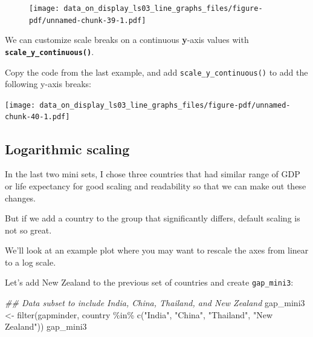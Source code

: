 \documentclass[
  letterpaper,
  DIV=11,
  numbers=noendperiod]{scrreprt}
\newenvironment{Shaded}{\begin{snugshade}}{\end{snugshade}}
\newcommand{\DocumentationTok}[1]{\textcolor[rgb]{0.37,0.37,0.37}{\textit{#1}}}
\newcommand{\FunctionTok}[1]{\textcolor[rgb]{0.28,0.35,0.67}{#1}}
\newcommand{\NormalTok}[1]{\textcolor[rgb]{0.00,0.23,0.31}{#1}}
\newcommand{\OtherTok}[1]{\textcolor[rgb]{0.00,0.23,0.31}{#1}}
\newcommand{\SpecialCharTok}[1]{\textcolor[rgb]{0.37,0.37,0.37}{#1}}
\newcommand{\StringTok}[1]{\textcolor[rgb]{0.13,0.47,0.30}{#1}}
\begin{document}
\begin{figure}[H]

{\centering \texttt{[image: data\_on\_display\_ls03\_line\_graphs\_files/figure-pdf/unnamed-chunk-39-1.pdf]}

}

\end{figure}

\begin{tcolorbox}[enhanced jigsaw, colframe=quarto-callout-tip-color-frame, rightrule=.15mm, opacityback=0, breakable, coltitle=black, colbacktitle=quarto-callout-tip-color!10!white, bottomrule=.15mm, leftrule=.75mm, toprule=.15mm, arc=.35mm, bottomtitle=1mm, colback=white, left=2mm, opacitybacktitle=0.6, titlerule=0mm, title=\textcolor{quarto-callout-tip-color}{\faLightbulb}\hspace{0.5em}{Practice}, toptitle=1mm]

We can customize scale breaks on a continuous \textbf{y}-axis values
with \textbf{\texttt{scale\_y\_continuous()}}.

Copy the code from the last example, and add
\texttt{scale\_y\_continuous()} to add the following y-axis breaks:

\texttt{[image: data\_on\_display\_ls03\_line\_graphs\_files/figure-pdf/unnamed-chunk-40-1.pdf]}

\end{tcolorbox}

\hypertarget{logarithmic-scaling}{%
\subsection{Logarithmic scaling}\label{logarithmic-scaling}}

In the last two mini sets, I chose three countries that had similar
range of GDP or life expectancy for good scaling and readability so that
we can make out these changes.

But if we add a country to the group that significantly differs, default
scaling is not so great.

We'll look at an example plot where you may want to rescale the axes
from linear to a log scale.

Let's add New Zealand to the previous set of countries and create
\texttt{gap\_mini3}:

\begin{Shaded}
\begin{Highlighting}[]
\DocumentationTok{\#\# Data subset to include India, China, Thailand, and New Zealand}
\NormalTok{gap\_mini3 }\OtherTok{\textless{}{-}} \FunctionTok{filter}\NormalTok{(gapminder,}
\NormalTok{                    country }\SpecialCharTok{\%in\%} \FunctionTok{c}\NormalTok{(}\StringTok{"India"}\NormalTok{,}
                                   \StringTok{"China"}\NormalTok{,}
                                   \StringTok{"Thailand"}\NormalTok{,}
                                   \StringTok{"New Zealand"}\NormalTok{))}
\NormalTok{gap\_mini3}
\end{Highlighting}
\end{Shaded}
\end{document}
